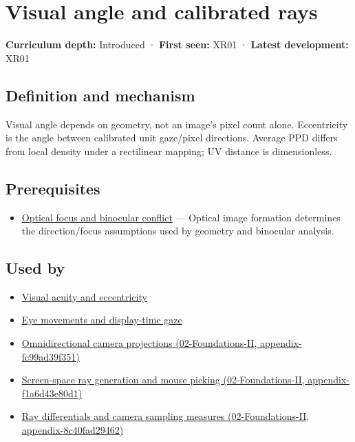 \hypertarget{appendix-7d356c396d1a}{}
\section{Visual angle and calibrated rays}\label{appendix-7d356c396d1a-visual-angle-and-calibrated-rays}

\textbf{Curriculum depth:} Introduced · \textbf{First seen:} XR01 · \textbf{Latest development:} XR01

\subsection{Definition and mechanism}\label{appendix-7d356c396d1a-definition-and-mechanism}

Visual angle depends on geometry, not an image's pixel count alone. Eccentricity is the angle between calibrated unit gaze/pixel directions. Average PPD differs from local density under a rectilinear mapping; UV distance is dimensionless.

\subsection{Prerequisites}\label{appendix-7d356c396d1a-prerequisites}

\begin{itemize}
\tightlist
\item
  \hyperref[appendix-f90cee1be7a4]{Optical focus and binocular conflict} --- Optical image formation determines the direction/focus assumptions used by geometry and binocular analysis.
\end{itemize}

\subsection{Used by}\label{appendix-7d356c396d1a-used-by}

\begin{itemize}
\item
  \hyperref[appendix-b491fc48c54b]{Visual acuity and eccentricity}
\item
  \hyperref[appendix-a6f2c4fe1996]{Eye movements and display-time gaze}
\item
  \href{../02-Foundations-II/main.pdf\#nameddest=appendix-fc99ad39f351}{Omnidirectional camera projections (02-Foundations-II, appendix-fc99ad39f351)}
\item
  \href{../02-Foundations-II/main.pdf\#nameddest=appendix-f1a6d43e80d1}{Screen-space ray generation and mouse picking (02-Foundations-II, appendix-f1a6d43e80d1)}
\item
  \href{../02-Foundations-II/main.pdf\#nameddest=appendix-8c40fad29462}{Ray differentials and camera sampling measures (02-Foundations-II, appendix-8c40fad29462)}
\end{itemize}

